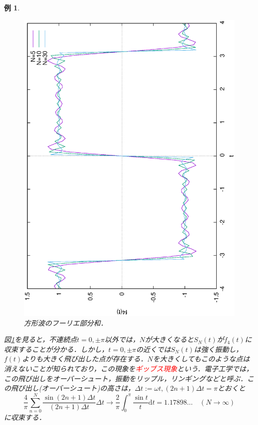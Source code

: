 \documentclass[a4j]{jsbook}
\newtheorem{example}[theorem]{例}
\numberwithin{theorem}{chapter}  %
\begin{document}
\begin{example}
\begin{figure}[htbp]
    \includegraphics[angle=-90, width=\linewidth]{A3-1.eps}
    \caption{方形波のフーリエ部分和．}
    \label{fig1-6}
\end{figure}
図\ref{fig1-6}を見ると，不連続点\(t=0, \pm\pi\)以外では，\(N\)が大きくなると\(S_N(t)\)が\(f_4(t)\)に収束することが分かる．しかし，\(t=0, \pm\pi\)の近くでは\(S_N(t)\)は強く振動し，\(f(t)\)よりも大きく飛び出した点が存在する．\(N\)を大きくしてもこのような点は消えないことが知られており，この現象を\textcolor{red}{ギッブス現象}という．電子工学では，この飛び出しをオーバーシュート，振動をリップル，リンギングなどと呼ぶ．この飛び出し(オーバーシュート)の高さは，\(\Delta t:=\omega t, (2n+1)\Delta t=\pi\)とおくと
\begin{equation*}
    \frac{4}{\pi}\sum_{n=0}^N \frac{\sin(2n+1)\Delta t}{(2n+1)\Delta t}\Delta t\to\frac{2}{\pi}\int_0^\pi \frac{\sin t}{t}\mathrm{d}t=1.17898\dots\quad (N\to\infty)
\end{equation*}
に収束する．
\end{example}
\end{document}
